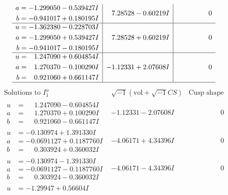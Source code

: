 \documentclass[1p]{elsarticle_modified}
\theoremstyle{definition}
\newcommand{\I}{\sqrt{-1}}
\begin{document}
$$\begin{array}{c|c|c}
\begin{aligned}
a &= -1.299050 - 0.539427 I \\
b &= -0.941017 + 0.180195 I\end{aligned}
 & \phantom{-}7.28528 - 0.60219 I & \phantom{-0.000000 } 0 \\ \hline\begin{aligned}
u &= -1.362380 - 0.228703 I \\
a &= -1.299050 + 0.539427 I \\
b &= -0.941017 - 0.180195 I\end{aligned}
 & \phantom{-}7.28528 + 0.60219 I & \phantom{-0.000000 } 0 \\ \hline\begin{aligned}
u &= \phantom{-}1.247090 + 0.604854 I \\
a &= \phantom{-}1.270370 - 0.100290 I \\
b &= \phantom{-}0.921060 + 0.661147 I\end{aligned}
 & -1.12331 + 2.07608 I & \phantom{-0.000000 } 0\\
 \hline 
 \end{array}$$\newpage$$\begin{array}{c|c|c}  
\text{Solutions to }I^u_{1}& \I (\text{vol} + \sqrt{-1}CS) & \text{Cusp shape}\\
 \hline 
\begin{aligned}
u &= \phantom{-}1.247090 - 0.604854 I \\
a &= \phantom{-}1.270370 + 0.100290 I \\
b &= \phantom{-}0.921060 - 0.661147 I\end{aligned}
 & -1.12331 - 2.07608 I & \phantom{-0.000000 } 0 \\ \hline\begin{aligned}
u &= -0.130974 + 1.391330 I \\
a &= -0.0691127 + 0.1187760 I \\
b &= \phantom{-}0.303924 + 0.360032 I\end{aligned}
 & -4.06171 + 4.34396 I & \phantom{-0.000000 } 0 \\ \hline\begin{aligned}
u &= -0.130974 - 1.391330 I \\
a &= -0.0691127 - 0.1187760 I \\
b &= \phantom{-}0.303924 - 0.360032 I\end{aligned}
 & -4.06171 - 4.34396 I & \phantom{-0.000000 } 0 \\ \hline\begin{aligned}
u &= -1.29947 + 0.56604 I \\

\end{aligned}
\end{array}$$
\end{document}
